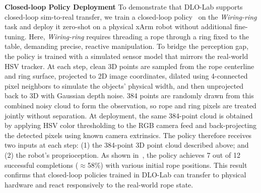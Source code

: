 \textbf{Closed-loop Policy Deployment}
To demonstrate that DLO-Lab supports closed-loop sim-to-real transfer, we train a closed-loop policy~\cite{schulman2017proximal} on the \textit{Wiring-ring} task and deploy it zero-shot on a physical xArm robot without additional fine-tuning. Here, \textit{Wiring-ring} requires threading a rope through a ring fixed to the table, demanding precise, reactive manipulation. To bridge the perception gap, the policy is trained with a simulated sensor model that mirrors the real-world HSV tracker. At each step, clean 3D points are sampled from the rope centerline and ring surface, projected to 2D image coordinates, dilated using 4-connected pixel neighbors to simulate the objects' physical width, and then unprojected back to 3D with Gaussian depth noise. 384 points are randomly drawn from this combined noisy cloud to form the observation, so rope and ring pixels are treated jointly without separation. At deployment, the same 384-point cloud is obtained by applying HSV color thresholding to the RGB camera feed and back-projecting the detected pixels using known camera extrinsics. The policy therefore receives two inputs at each step: (1) the 384-point 3D point cloud described above; and (2) the robot's proprioception. As shown in~, the policy achieves 7 out of 12 successful completions ($\approx$58\%) with various initial rope positions. This result confirms that closed-loop policies trained in DLO-Lab can transfer to physical hardware and react responsively to the real-world rope state.

\label{section:experiment_real}
